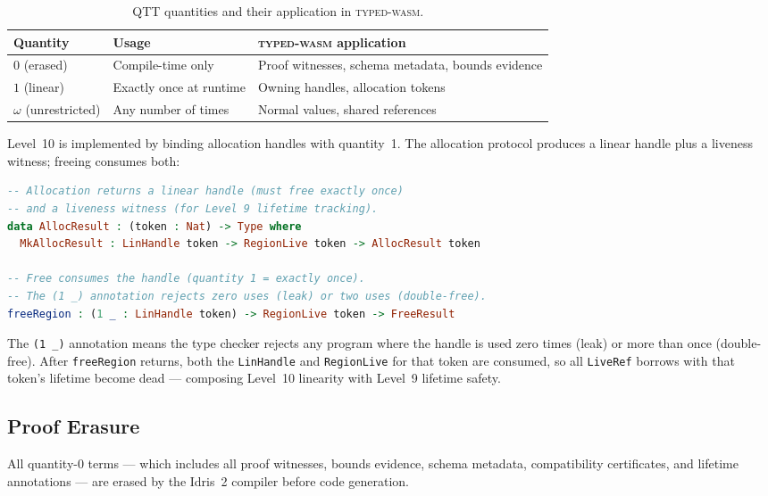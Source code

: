 \documentclass[11pt,a4paper]{article}
\newcommand{\typedwasm}{\textsc{typed-wasm}}
\begin{document}
\begin{table}[htbp]
\centering
\caption{QTT quantities and their application in \typedwasm{}.}
\label{tab:qtt}
\begin{tabularx}{\textwidth}{@{}llX@{}}
\toprule
\textbf{Quantity} & \textbf{Usage} & \textbf{\typedwasm{} application} \\
\midrule
$0$ (erased) & Compile-time only & Proof witnesses, schema metadata, bounds evidence \\
$1$ (linear) & Exactly once at runtime & Owning handles, allocation tokens \\
$\omega$ (unrestricted) & Any number of times & Normal values, shared references \\
\bottomrule
\end{tabularx}
\end{table}

Level~10 is implemented by binding allocation handles with quantity~1.
The allocation protocol produces a linear handle plus a liveness witness;
freeing consumes both:

\begin{lstlisting}[language=Idris]
-- Allocation returns a linear handle (must free exactly once)
-- and a liveness witness (for Level 9 lifetime tracking).
data AllocResult : (token : Nat) -> Type where
  MkAllocResult : LinHandle token -> RegionLive token -> AllocResult token

-- Free consumes the handle (quantity 1 = exactly once).
-- The (1 _) annotation rejects zero uses (leak) or two uses (double-free).
freeRegion : (1 _ : LinHandle token) -> RegionLive token -> FreeResult
\end{lstlisting}

The \lstinline{(1 _)} annotation means the type checker rejects any
program where the handle is used zero times (leak) or more than once
(double-free).  After \lstinline{freeRegion} returns, both the
\lstinline{LinHandle} and \lstinline{RegionLive} for that token are
consumed, so all \lstinline{LiveRef} borrows with that token's lifetime
become dead --- composing Level~10 linearity with Level~9 lifetime
safety.

\subsection{Proof Erasure}
\label{sec:erasure}

All quantity-0 terms --- which includes all proof witnesses, bounds
evidence, schema metadata, compatibility certificates, and lifetime
annotations --- are erased by the Idris~2 compiler before code
generation.
\end{document}
